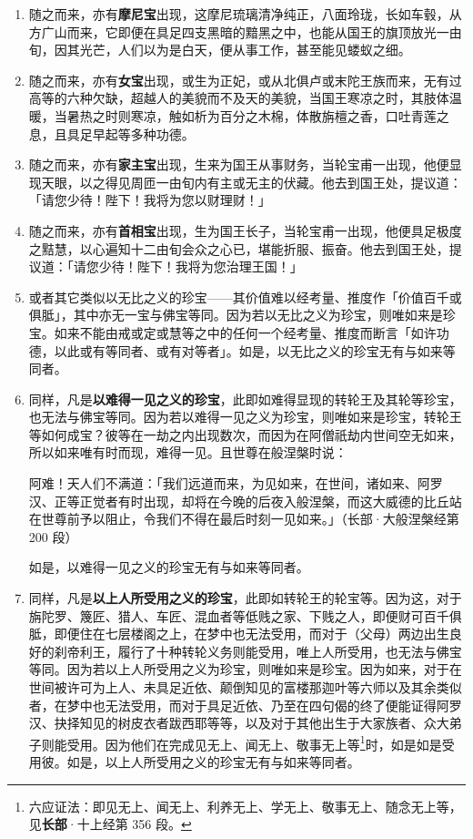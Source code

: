 \begin{enumerate}
\item 随之而来，亦有\textbf{摩尼宝}出现，这摩尼琉璃清净纯正，八面玲珑，长如车毂，从方广山而来，它即便在具足四支黑暗的黯黑之中，也能从国王的旗顶放光一由旬，因其光芒，人们以为是白天，便从事工作，甚至能见蝼蚁之细。
\item 随之而来，亦有\textbf{女宝}出现，或生为正妃，或从北俱卢或末陀王族而来，无有过高等的六种欠缺，超越人的美貌而不及天的美貌，当国王寒凉之时，其肢体温暖，当暑热之时则寒凉，触如析为百分之木棉，体散旃檀之香，口吐青莲之息，且具足早起等多种功德。
\item 随之而来，亦有\textbf{家主宝}出现，生来为国王从事财务，当轮宝甫一出现，他便显现天眼，以之得见周匝一由旬内有主或无主的伏藏。他去到国王处，提议道：「请您少待！陛下！我将为您以财理财！」
\item 随之而来，亦有\textbf{首相宝}出现，生为国王长子，当轮宝甫一出现，他便具足极度之黠慧，以心遍知十二由旬会众之心已，堪能折服、振奋。他去到国王处，提议道：「请您少待！陛下！我将为您治理王国！」
\item 或者其它类似以无比之义的珍宝——其价值难以经考量、推度作「价值百千或俱胝」，其中亦无一宝与佛宝等同。因为若以无比之义为珍宝，则唯如来是珍宝。如来不能由戒或定或慧等之中的任何一个经考量、推度而断言「如许功德，以此或有等同者、或有对等者」。如是，以无比之义的珍宝无有与如来等同者。
\item 同样，凡是\textbf{以难得一见之义的珍宝}，此即如难得显现的转轮王及其轮等珍宝，也无法与佛宝等同。因为若以难得一见之义为珍宝，则唯如来是珍宝，转轮王等如何成宝？彼等在一劫之内出现数次，而因为在阿僧祇劫内世间空无如来，所以如来唯有时而现，难得一见。且世尊在般涅槃时说：\begin{quoting}阿难！天人们不满道：「我们远道而来，为见如来，在世间，诸如来、阿罗汉、正等正觉者有时出现，却将在今晚的后夜入般涅槃，而这大威德的比丘站在世尊前予以阻止，令我们不得在最后时刻一见如来。」（长部·大般涅槃经第 200 段）\end{quoting}如是，以难得一见之义的珍宝无有与如来等同者。
\item 同样，凡是\textbf{以上人所受用之义的珍宝}，此即如转轮王的轮宝等。因为这，对于旃陀罗、篾匠、猎人、车匠、混血者等低贱之家、下贱之人，即便财可百千俱胝，即便住在七层楼阁之上，在梦中也无法受用，而对于（父母）两边出生良好的刹帝利王，履行了十种转轮义务则能受用，唯上人所受用，也无法与佛宝等同。因为若以上人所受用之义为珍宝，则唯如来是珍宝。因为如来，对于在世间被许可为上人、未具足近依、颠倒知见的富楼那迦叶等六师以及其余类似者，在梦中也无法受用，而对于具足近依、乃至在四句偈的终了便能证得阿罗汉、抉择知见的树皮衣者跋西耶等等，以及对于其他出生于大家族者、众大弟子则能受用。因为他们在完成见无上、闻无上、敬事无上等\footnote{六应证法：即见无上、闻无上、利养无上、学无上、敬事无上、随念无上等，见\textbf{长部}·十上经第 356 段。}时，如是如是受用彼。如是，以上人所受用之义的珍宝无有与如来等同者。

\end{enumerate}

